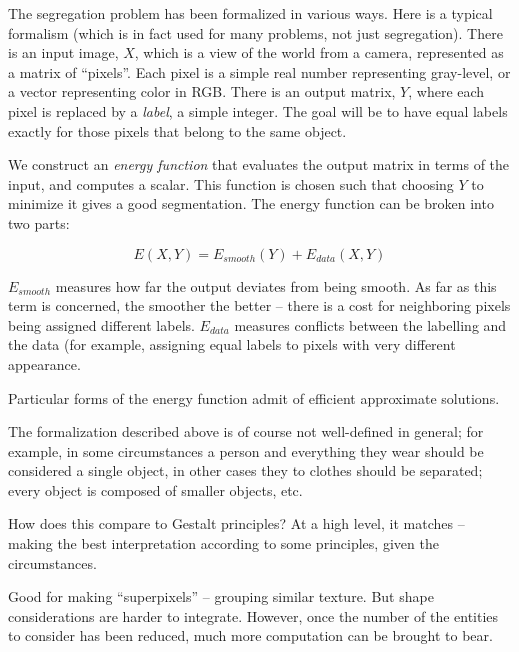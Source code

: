 The segregation problem has been formalized in various ways.  Here is
a typical formalism (which is in fact used for many problems, not just
segregation).  There is an input image, $X$, which is a view of the
world from a camera, represented as a matrix of ``pixels''.  Each
pixel is a simple real number representing gray-level, or a vector
representing color in RGB.
%
There is an output matrix, $Y$, where each pixel is replaced by
a {\em label}, a simple integer.  The goal will be to have
equal labels exactly for those pixels that belong to the same object.

We construct an {\em energy function} that evaluates the output matrix
in terms of the input, and computes a scalar.  This function is chosen
such that choosing $Y$ to minimize it gives a good segmentation.
The energy function can be broken into two parts:

\begin{displaymath}
%
E(X,Y) = E_{smooth}(Y) + E_{data}(X,Y)
%
\end{displaymath}

$E_{smooth}$ measures how far the output deviates from being smooth.
As far as this term is concerned, the smoother the better -- there is
a cost for neighboring pixels being assigned different labels.
$E_{data}$ measures conflicts between the labelling and the data (for
example, assigning equal labels to pixels with very different
appearance.

Particular forms of the energy function admit of efficient 
approximate solutions.


The formalization described above is of course
not well-defined in general; for example, in some
circumstances a person and everything they wear should be
considered a single object, in other cases they to clothes
should be separated; every object is composed of smaller
objects, etc.  

How does this compare to Gestalt principles?  At a high level, it
matches -- making the best interpretation according to some
principles, given the circumstances.

Good for making ``superpixels'' -- grouping similar texture.
But shape considerations are harder to integrate.  However,
once the number of the entities to consider has been 
reduced, much more computation can be brought to bear.


